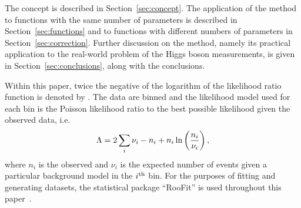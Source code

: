 The concept is described in Section~\ref{sec:concept}.
The application of the method to functions with the same number of parameters
is described in Section~\ref{sec:functions} and to functions with different
numbers of parameters in Section~\ref{sec:correction}. Further discussion on
the method, namely its practical application to the real-world problem of
the Higgs boson measurements, is given in Section~\ref{sec:conclusions},
along with the conclusions.

Within this paper, twice the negative of the logarithm of the likelihood ratio 
function is denoted by \nll. The data are binned and the
likelihood model used for each bin is the Poisson likelihood ratio to the best
possible likelihood given the observed data, i.e.
\begin{equation}
\nll = 2%
\sum_{i} \nu_i - n_i + n_i \ln\left(\frac{n_i}{\nu_i}\right),
\label{eqn:introduction:def2NLL}
\end{equation}
where $n_{i}$ is the observed and $\nu_{i}$ is the expected number of events
given a particular background model in the $i^{\rm th}$ bin.
For the purposes of fitting and generating datasets, the statistical package
``RooFit'' is used throughout this paper~\cite{ref:roofit}.

